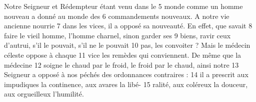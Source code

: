 Notre Seigneur et Rédempteur étant venu dans le	 
5	 	monde comme un homme nouveau a donné au monde des	 
6	 	commandements nouveaux. A notre vie ancienne nourrie	 
7	 	dans les vices, il a opposé sa nouveauté. En effet, que savait	 
8	 	faire le vieil homme, l'homme charnel, sinon garder ses	 
9	 	biens, ravir ceux d'autrui, s'il le pouvait, s'il ne le pouvait	 
10	 	pas, les convoiter ? Mais le médecin céleste oppose à chaque	 
11	 	vice les remèdes qui conviennent. De même que la médecine	 
12	 	soigne le chaud par le froid, le froid par le chaud, ainsi notre	 
13	 	Seigneur a opposé à nos péchés des ordonnances contraires :	 
14	 	il a prescrit aux impudiques la continence, aux avares la libé-	 
15	 	ralité, aux coléreux la douceur, aux orgueilleux l'humilité.